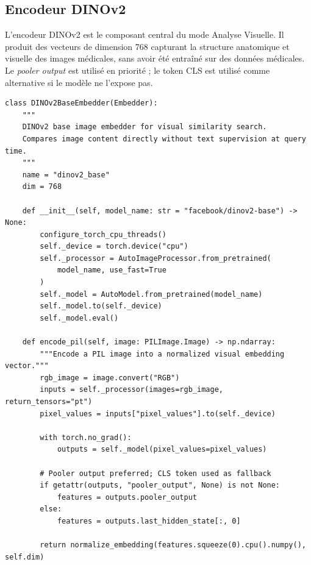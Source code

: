 \documentclass[12pt,a4paper]{article}
\begin{document}
\subsection{Encodeur DINOv2}

\noindent L'encodeur DINOv2 est le composant central du mode Analyse Visuelle.
Il produit des vecteurs de dimension 768 capturant la structure anatomique et
visuelle des images médicales, sans avoir été entraîné sur des données médicales.
Le \textit{pooler output} est utilisé en priorité ; le token CLS est utilisé
comme alternative si le modèle ne l'expose pas.

\begin{lstlisting}[style=mediscan, caption={Implémentation de l'encodeur DINOv2 (src/mediscan/embedders/dinov2\_base.py)}]
class DINOv2BaseEmbedder(Embedder):
    """
    DINOv2 base image embedder for visual similarity search.
    Compares image content directly without text supervision at query time.
    """
    name = "dinov2_base"
    dim = 768

    def __init__(self, model_name: str = "facebook/dinov2-base") -> None:
        configure_torch_cpu_threads()
        self._device = torch.device("cpu")
        self._processor = AutoImageProcessor.from_pretrained(
            model_name, use_fast=True
        )
        self._model = AutoModel.from_pretrained(model_name)
        self._model.to(self._device)
        self._model.eval()

    def encode_pil(self, image: PILImage.Image) -> np.ndarray:
        """Encode a PIL image into a normalized visual embedding vector."""
        rgb_image = image.convert("RGB")
        inputs = self._processor(images=rgb_image, return_tensors="pt")
        pixel_values = inputs["pixel_values"].to(self._device)

        with torch.no_grad():
            outputs = self._model(pixel_values=pixel_values)

        # Pooler output preferred; CLS token used as fallback
        if getattr(outputs, "pooler_output", None) is not None:
            features = outputs.pooler_output
        else:
            features = outputs.last_hidden_state[:, 0]

        return normalize_embedding(features.squeeze(0).cpu().numpy(), self.dim)
\end{lstlisting}

\end{document}
